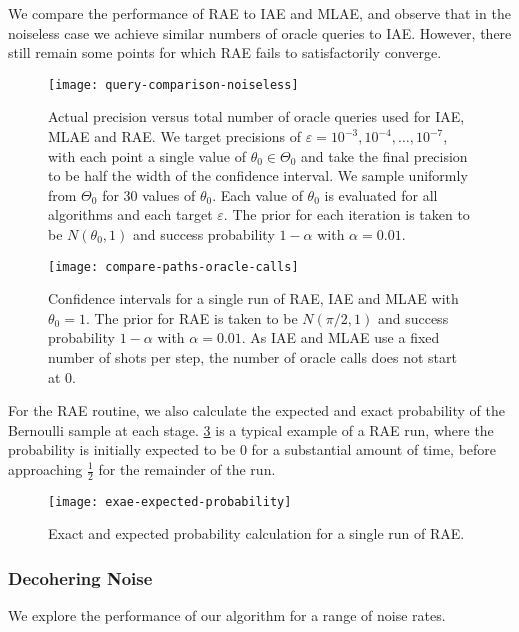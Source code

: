 We compare the performance of RAE to IAE and MLAE, and observe that in the noiseless case we achieve similar numbers of oracle queries to IAE. However, there still remain some points for which RAE fails to satisfactorily converge.

\begin{figure}[htbp]
	\centering
	\texttt{[image: query-comparison-noiseless]}
	\caption{Actual precision versus total number of oracle queries used for IAE, MLAE and RAE. We target precisions of $\varepsilon = 10^{-3}, 10^{-4}, \ldots , 10^{-7}$, with each point a single value of $\theta_0 \in \Theta_0$ and take the final precision to be half the width of the confidence interval. We sample uniformly from $\Theta_0$ for 30 values of $\theta_0$. Each value of $\theta_0$ is evaluated for all algorithms and each target $\varepsilon$. The prior for each iteration is taken to be $N(\theta_0, 1)$ and success probability $1 - \alpha$ with $\alpha = 0.01$.}
	\label{fig::query-comparison-noiseless}
\end{figure}


\begin{figure}[htbp]
	\centering
	\texttt{[image: compare-paths-oracle-calls]}
	\caption{Confidence intervals for a single run of RAE, IAE and MLAE with $\theta_0 = 1$. The prior for RAE is taken to be $N(\pi/2, 1)$ and success probability $1 - \alpha$ with $\alpha = 0.01$. As IAE and MLAE use a fixed number of shots per step, the number of oracle calls does not start at 0.}
	\label{fig::compare-paths-oracle-calls}
\end{figure}

For the RAE routine, we also calculate the expected and exact probability of the Bernoulli sample at each stage. \ref{fig::exae-expected-probability} is a typical example of a RAE run, where the probability is initially expected to be 0 for a substantial amount of time, before approaching $\frac{1}{2}$ for the remainder of the run.

\begin{figure}[htpb]
	\centering
	\texttt{[image: exae-expected-probability]}
	\caption{Exact and expected probability calculation for a single run of RAE.}
	\label{fig::exae-expected-probability}
\end{figure}

\subsubsection{Decohering Noise}
We explore the performance of our algorithm for a range of noise rates.

